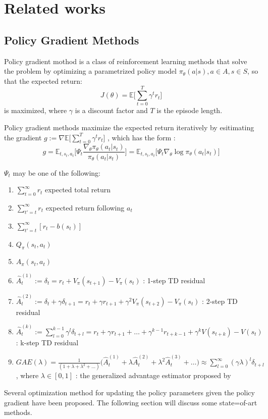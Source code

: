 \chapter{Related works}
\section{Policy Gradient Methods}
Policy gradient mothod is a class of reinforcement learning methods that solve the problem by optimizing a parametrized policy model $\pi_\theta (a|s), a\in A, s\in S$, so that the expected return:
$$
    J(\theta) = \mathbb{E}\big[\sum_{t=0}^T\gamma^t r_t \big]
$$
is maximized, where $\gamma$ is a discount factor and $T$ is the episode length.

Policy gradient methods maximize the expected return iteratively by esitimating the gradient $g := \nabla  \mathbb{E}\big[\sum_{t=0}^T\gamma^t r_t \big]$ , which has the form \cite{schulman2015high}:
\begin{equation} g = \mathbb{E}_{t,s_t,a_t} \big[
\Psi_t \frac{\nabla_\theta \pi_\theta(a_t|s_t) }{\pi_\theta(a_t|s_t)}
\big]
=\mathbb{E}_{t,s_t,a_t} \big[
\Psi_t \nabla_\theta \log \pi_\theta(a_t|s_t) 
\big]
\label{pg_def}\end{equation}


$\Psi_t$ may be one of the following:
\begin{enumerate}
    \item $\sum_{t=0}^{\infty} r_t$ expected total return
    \item $\sum_{t'=t}^{\infty} r_t$ expected return following $a_t$
    \item $\sum_{t'=t}^{\infty} [r_t - b(s_t)]$
    \item $Q_\pi (s_t, a_t)$
    \item $A_\pi (s_t, a_t)$
    \item $ \hat{A}_t^{(1)}:=  \delta_t = r_t + V_\pi (s_{t+1}) - V_\pi (s_{t})$ : 1-step TD residual
    \item $ \hat{A}_t^{(2)} :=  \delta_t + \gamma \delta_{t+1}= r_t +\gamma r_{t+1} + \gamma^2 V_\pi (s_{t+2}) - V_\pi (s_{t})$ : 2-step TD residual
    \item $\hat{A}_t^{(k)} := \sum_{l=0}^{k-1} \gamma^{l} \delta_{t+l} =   r_t + \gamma r_{t+1} + \dots + \gamma^{k-1} r_{t+k-1} + \gamma^{k} V(s_{t+k}) -V(s_t)$ : k-step TD residual
    \item $GAE(\lambda) = \frac{1}{(1+\lambda+\lambda^2+\dots)} \big(\hat{A}_t^{(1)} + \lambda \hat{A}_t^{(2)}+ \lambda^2 \hat{A}_t^{(3)} +\dots \big) 
    \approx \sum_{l=0}^{\infty} (\gamma \lambda)^l \delta_{t+l}$ , where $\lambda \in [0,1]$ : the generalized advantage estimator proposed by \cite{schulman2015high}
\end{enumerate}
Several optimization method for updating the policy parameters given the policy gradient have been proposed. The following section will discuss some state=of-art methods.
